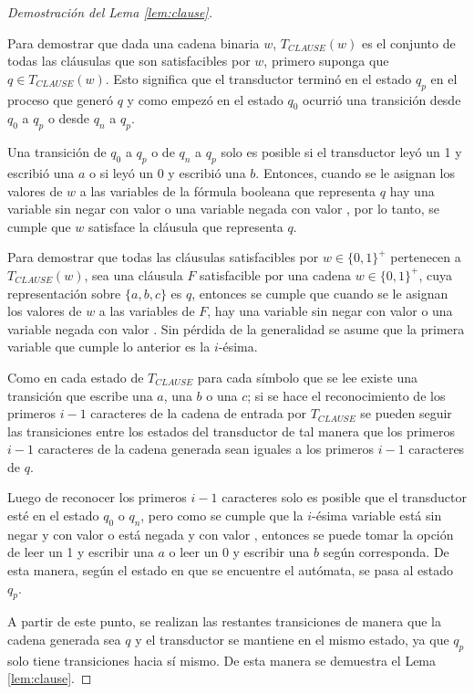 \begin{proof}[Demostración del Lema \ref{lem:clause}] \
    
    Para demostrar que dada una cadena binaria $w$, $T_{CLAUSE}(w)$ es el conjunto de todas las cláusulas que 
    son satisfacibles por $w$, primero suponga que $q\in T_{CLAUSE}(w)$.  Esto significa que el transductor 
    terminó en el estado $q_p$ en el proceso que generó $q$ y como empezó en el estado $q_0$ ocurrió una 
    transición desde $q_0$ a $q_p$ o desde $q_n$ a $q_p$. 
    
    Una transición de $q_0$ a $q_p$ o de $q_n$ a $q_p$ solo es posible si el transductor leyó un 1 y 
    escribió una $a$ o si leyó un 0 y escribió una $b$. Entonces, cuando se le asignan los valores de 
    $w$ a las variables de la fórmula booleana que representa $q$ hay una variable sin negar con valor 
    \true{} o una variable negada con valor \false{}, por lo tanto, se cumple que $w$ satisface la cláusula 
    que representa $q$. 
    
    Para demostrar que todas las cláusulas satisfacibles por $w\in\{0,1\}^+$ pertenecen a $T_{CLAUSE}(w)$, sea una cláusula $F$ satisfacible por una cadena $w\in\{0,1\}^+$, cuya representación sobre $\{a,b,c\}$ es $q$, entonces se cumple que cuando se le asignan los valores de $w$ a las variables de $F$, hay una variable sin negar con valor \true{} o una variable negada con valor \false{}. Sin pérdida de la generalidad se asume que la primera variable que cumple lo anterior es la $i$-ésima.
    
    Como en cada estado de $T_{CLAUSE}$ para cada símbolo que se lee existe una transición que escribe una $a$, una $b$ o una $c$; si se hace el reconocimiento de los primeros $i-1$ caracteres de la cadena de entrada por $T_{CLAUSE}$ se pueden seguir las transiciones entre los estados del transductor de tal manera que los primeros $i-1$ caracteres de la cadena generada sean iguales a los primeros $i-1$ caracteres de $q$.
    
    Luego de reconocer los primeros $i-1$ caracteres solo es posible que el transductor esté en el estado $q_0$ o $q_n$, pero como se cumple que la $i$-ésima variable está sin negar y con valor \true{} o está negada y con valor \false{}, entonces se puede tomar la opción de leer un 1 y escribir una $a$ o leer un 0 y escribir una $b$ según corresponda.  De esta manera, según el estado en que se encuentre el autómata, se pasa al estado $q_p$.
    
    A partir de este punto, se realizan las restantes transiciones de manera que la cadena generada sea $q$ y el transductor se mantiene en el mismo estado, ya que $q_p$ solo tiene transiciones hacia sí mismo. De esta manera se demuestra el Lema \ref{lem:clause}. 
\end{proof}

